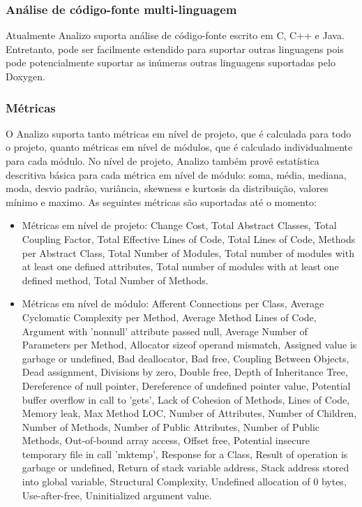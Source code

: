 \subsubsection{Análise de código-fonte multi-linguagem}

Atualmente Analizo suporta análise de código-fonte escrito em C, C++ e Java.
Entretanto, pode ser facilmente estendido para suportar outras linguagens pois
pode potencialmente suportar as inúmeras outras linguagens suportadas pelo Doxygen.

\subsubsection{Métricas}\label{metricas}

O Analizo suporta tanto métricas em nível de projeto, que é calculada para todo o projeto,
quanto métricas em nível de módulos, que é calculado individualmente para cada módulo.
No nível de projeto, Analizo também provê estatística descritiva básica para cada métrica em
nível de módulo: soma, média, mediana, moda, desvio padrão, variância, skewness e kurtosis da
distribuição, valores mínimo e maximo. As seguintes métricas são suportadas até o momento:

\begin{itemize}

  \item Métricas em nível de projeto: Change Cost, Total Abstract Classes,
  Total Coupling Factor, Total Effective Lines of Code, Total Lines of Code,
  Methods per Abstract Class, Total Number of Modules, Total number of modules
  with at least one defined attributes, Total number of modules with at least
  one defined method, Total Number of Methods.

  \item Métricas em nível de módulo: Afferent Connections per Class, Average
  Cyclomatic Complexity per Method, Average Method Lines of Code, Argument with
  'nonnull' attribute passed null, Average Number of Parameters per Method,
  Allocator sizeof operand mismatch, Assigned value is garbage or undefined,
  Bad deallocator, Bad free, Coupling Between Objects, Dead assignment,
  Divisions by zero, Double free, Depth of Inheritance Tree, Dereference of
  null pointer, Dereference of undefined pointer value, Potential buffer
  overflow in call to 'gets', Lack of Cohesion of Methods, Lines of Code,
  Memory leak, Max Method LOC, Number of Attributes, Number of Children, Number
  of Methods, Number of Public Attributes, Number of Public Methods,
  Out-of-bound array access, Offset free, Potential insecure temporary file in
  call 'mktemp', Response for a Class, Result of operation is garbage or
  undefined, Return of stack variable address, Stack address stored into global
  variable, Structural Complexity, Undefined allocation of 0 bytes,
  Use-after-free, Uninitialized argument value.

\end{itemize}

